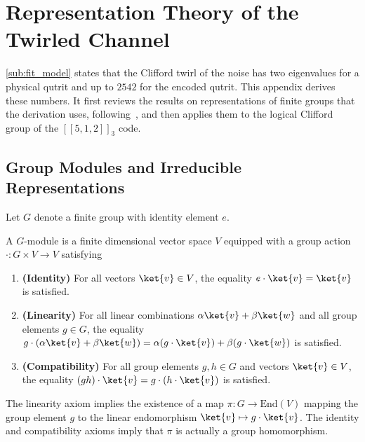 \section{Representation Theory of the Twirled Channel}\label{sec:rep-theory}

\autoref{sub:fit_model} states that the Clifford twirl of the noise has two eigenvalues for a physical qutrit and up to $2542$ for the encoded qutrit. This appendix derives these numbers. It first reviews the results on representations of finite groups that the derivation uses, following~\cite{sagan2001symmetric}, and then applies them to the logical Clifford group of the $[[5,1,2]]_3$ code.

\subsection{Group Modules and Irreducible Representations}\label{app:rep-modules}

Let $G$ denote a finite group with identity element $e$.

A $G$-module is a finite dimensional vector space $V$ equipped with a group action $\cdot : G \times V \to V$ satisfying 
\begin{enumerate}
    \item \textbf{(Identity)} For all vectors $\ket{v} \in V$, the equality $e \cdot \ket{v} = \ket{v}$ is satisfied.
    \item \textbf{(Linearity)} For all linear combinations $\alpha \ket{v} + \beta \ket{w}$ and all group elements $g \in G$, the equality $g \cdot (\alpha \ket{v}+\beta\ket{w}) = \alpha (g\cdot \ket{v}) + \beta (g \cdot \ket{w})$ is satisfied.
    \item \textbf{(Compatibility)} For all group elements $g,h \in G$ and vectors $\ket{v} \in V$, the equality $(gh) \cdot \ket{v} = g\cdot (h \cdot \ket{v})$ is satisfied.
\end{enumerate}
The linearity axiom implies the existence of a map $\pi: G \to \mathrm{End}(V)$ mapping the group element $g$ to the linear endomorphism $\ket{v} \mapsto g\cdot \ket{v}$. 
The identity and compatibility axioms imply that $\pi$ is actually a group homomorphism. 

